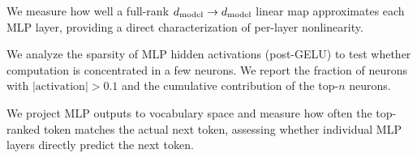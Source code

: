 We measure how well a full-rank $d_{\text{model}} \to d_{\text{model}}$ linear map approximates each MLP layer, providing a direct characterization of per-layer nonlinearity.

We analyze the sparsity of MLP hidden activations (post-GELU) to test whether computation is concentrated in a few neurons.
We report the fraction of neurons with $|\text{activation}| > 0.1$ and the cumulative contribution of the top-$n$ neurons.

We project MLP outputs to vocabulary space and measure how often the top-ranked token matches the actual next token, assessing whether individual MLP layers directly predict the next token.
